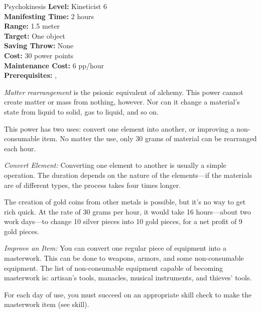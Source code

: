 {Psychokinesis}
{
	\textbf{Level:}
	Kineticist 6\\
	\textbf{Manifesting Time:}
	2 hours\\
	\textbf{Range:}
	1.5 meter\\
	\textbf{Target:}
	One object\\
	\textbf{Saving Throw:}
	None \\
	\textbf{Cost:}
	30 power points\\
	\textbf{Maintenance Cost:}
	6 pp/hour\\
	\textbf{Prerequisites:}
	, \\
}
{
	\emph{Matter rearrangement} is the psionic equivalent of alchemy. This power cannot create matter or mass from nothing, however. Nor can it change a material's state from liquid to solid, gas to liquid, and so on.%

	This power has two uses: convert one element into another, or improving a non-consumable item. No matter the use, only 30 grams of material can be rearranged each hour.

	\textit{Convert Element:} Converting one element to another is usually a simple operation. The duration depends on the nature of the elements---if the materials are of different types, the process takes four times longer.



	The creation of gold coins from other metals is possible, but it's no way to get rich quick. At the rate of 30 grams per hour, it would take 16 hours---about two work days---to change 10 silver pieces into 10 gold pieces, for a net profit of 9 gold pieces.

	\textit{Improve an Item:} You can convert one regular piece of equipment into a masterwork. This can be done to weapons, armors, and some non-consumable equipment. The list of non-consumable equipment capable of becoming masterwork is: artisan's tools, manacles, musical instruments, and thieves' tools.

	For each day of use, you must succeed on an appropriate skill check to make the masterwork item (see  skill).
}
